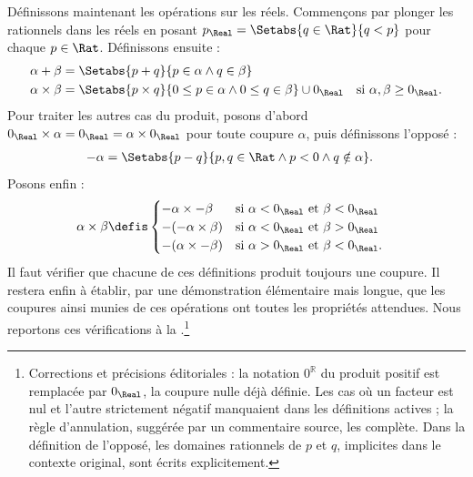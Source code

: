 \documentclass[11pt,a4paper,openany]{memoir}
\begin{document}
Définissons maintenant les opérations sur les réels. Commençons par
plonger les rationnels dans les réels en posant
$p_\Real = \Setabs{q \in \Rat}{q < p}$ pour chaque $p \in \Rat$.
Définissons ensuite :
\begin{align*}
	\alpha + \beta &= \Setabs{p + q}{p \in \alpha \land q \in \beta}\\
	\alpha \times \beta &=
	\Setabs{p \times q}{0 \leq p \in \alpha \land 0 \leq q \in \beta} \cup 0_\Real & \text{si }\alpha, \beta \geq 0_\Real.
\end{align*}
Pour traiter les autres cas du produit, posons d'abord
$0_\Real \times \alpha = 0_\Real = \alpha \times 0_\Real$ pour toute
coupure $\alpha$, puis définissons l'opposé :
\begin{align*}
	-\alpha &= \Setabs{p - q}{p,q \in \Rat \land p < 0 \land q \notin \alpha}.
\end{align*}
Posons enfin :
\begin{align*}
	\alpha \times \beta &\defis
	\begin{cases}
		\mathord{-}\alpha \times \mathord{-}\beta &\text{si }\alpha < 0_\Real\text{ et }\beta < 0_\Real\\
		\mathord{-}(\mathord{-}\alpha \times \beta) &\text{si }\alpha < 0_\Real \text{ et }\beta > 0_\Real\\
		\mathord{-}(\alpha \times \mathord{-}\beta) &\text{si }\alpha > 0_\Real \text{ et }\beta < 0_\Real.
	\end{cases}
\end{align*}
Il faut vérifier que chacune de ces définitions produit toujours une
coupure. Il restera enfin à établir, par une démonstration élémentaire
mais longue, que les coupures ainsi munies de ces opérations ont toutes
les propriétés attendues. Nous reportons ces vérifications à la
.\footnote{Corrections et précisions éditoriales : la notation $0^\mathbb{R}$ du produit positif est remplacée par $0_\Real$, la coupure nulle déjà définie. Les cas où un facteur est nul et l'autre strictement négatif manquaient dans les définitions actives ; la règle d'annulation, suggérée par un commentaire source, les complète. Dans la définition de l'opposé, les domaines rationnels de $p$ et $q$, implicites dans le contexte original, sont écrits explicitement.}
\end{document}
